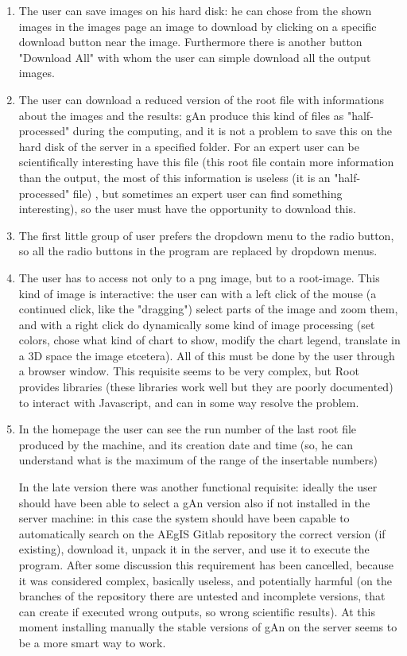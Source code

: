 \begin{enumerate}
\item The user can save images on his hard disk: he can chose from the shown images in the images page an image to download by clicking on a specific download button near the image. Furthermore there is another button "Download All" with whom the user can simple download all the output images.

\item The user can download a reduced version of the root file with informations about the images and the results: gAn produce this kind of files as "half-processed" during the computing, and it is not a problem to save this on the hard disk of the server in a specified folder. For an expert user can be scientifically interesting have this file (this root file contain more information than the output, the most of this information is useless (it is an "half-processed" file) , but sometimes an expert user can find something interesting), so the user must have the opportunity to download this.     

\item The first little group of user prefers the dropdown menu to the radio button, so all the radio buttons in the program are replaced by dropdown menus.

\item The user has to access not only to a png image, but to a root-image. This kind of image is interactive: the user can with a left click of the mouse (a continued click, like the "dragging") select parts of the image and zoom them, and with a right click do dynamically some kind of image processing (set colors, chose  what kind of chart to show, modify the chart legend, translate in a 3D space the image etcetera). All of this must be done by the user through a browser window.  This requisite seems to be very complex, but Root provides libraries (these libraries work well but they are poorly documented) to interact with Javascript, and can in some way resolve the problem.  

\item In the homepage the user can see the run number of the last root file produced by the machine, and its creation date and time (so, he can understand what is the maximum of the range of the insertable numbers) 

In the late version there was another functional requisite: ideally the user should have been able to select a gAn version also if not installed in the server machine: in this case the system should have been capable to automatically search on the AEgIS Gitlab repository the correct version (if existing), download it, unpack it in the server, and use it to execute the program. 
After some discussion this requirement has been cancelled, because it was considered complex, basically useless, and potentially harmful (on the branches of the repository there are untested and incomplete versions, that can create if executed wrong outputs, so wrong scientific results). At this moment installing manually the stable versions of gAn on the server seems to be a more smart way to work.


\end{enumerate}
